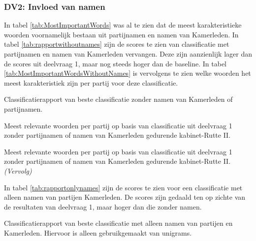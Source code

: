 \subsubsection{DV2: Invloed van namen}
In tabel \ref{tab:MostImportantWords} was al te zien dat de meest karakteristieke woorden voornamelijk bestaan uit partijnamen en namen van Kamerleden. In tabel \ref{tab:rapportwithoutnames} zijn de scores te zien van classificatie met partijnamen en namen van Kamerleden vervangen. Deze zijn aanzienlijk lager dan de scores uit deelvraag 1, maar nog steeds hoger dan de baseline. In tabel \ref{tab:MostImportantWordsWithoutNames} is vervolgens te zien welke woorden het meest karakteristiek zijn per partij voor deze classificatie.\par
\begin{table}[H]
\caption{Classificatierapport van beste classificatie zonder namen van Kamerleden of partijnamen.}
\label{tab:rapportwithoutnames}
\centering

\end{table}

\begin{table}[H] 
\caption{Meest relevante woorden per partij op basis van classificatie uit deelvraag 1 zonder partijnamen of namen van Kamerleden gedurende kabinet-Rutte II.} 
\label{tab:MostImportantWordsWithoutNames} 
\centering
\hspace*{-1in}
 
\end{table} 
\addtocounter{table}{-1} 
\begin{table}[H] 
\caption{Meest relevante woorden per partij op basis van classificatie uit deelvraag 1 zonder partijnamen of namen van Kamerleden gedurende kabinet-Rutte II. \emph{(Vervolg)}} 
\centering
\hspace*{-0.6in}
 
\end{table}

In tabel \ref{tab:rapportonlynames} zijn de scores te zien voor een classificatie met alleen namen van partijen Kamerleden. De scores zijn gedaald ten op zichte van de resultaten van deelvraag 1, maar hoger dan die zonder namen.\par
\begin{table}[H]
\caption{Classificatierapport van beste classificatie met alleen namen van partijen en Kamerleden. Hiervoor is alleen gebruikgemaakt van unigrams.}
\label{tab:rapportonlynames}
\centering

\end{table}

